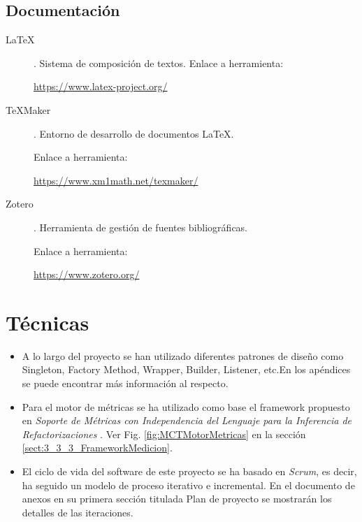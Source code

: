 \subsection{Documentación}
\begin{description}
	\item[LaTeX]. Sistema de composición de textos.
		Enlace a herramienta:
		
		\url{https://www.latex-project.org/}
		
	\item[TeXMaker]. Entorno de desarrollo de documentos LaTeX.
	
		Enlace a herramienta:
		
		\url{https://www.xm1math.net/texmaker/}
	
	\item[Zotero]. Herramienta de gestión de fuentes bibliográficas.
		
		Enlace a herramienta:
		
		\url{https://www.zotero.org/}
	
\end{description}
\section{Técnicas}
\begin{itemize}
	\item A lo largo del proyecto se han utilizado diferentes patrones de diseño \cite{gamma_patrones_2002} como Singleton, Factory Method, Wrapper, Builder, Listener, etc.En los apéndices se puede encontrar más información al respecto.
	
	\item Para el motor de métricas se ha utilizado como base el framework propuesto en \textit{Soporte de Métricas con Independencia del Lenguaje para la Inferencia de Refactorizaciones} \cite{marticorena_sanchez_soporte_2005}. Ver Fig. \ref{fig:MCTMotorMetricas} en la sección \ref{sect:3_3_3_FrameworkMedicion}.
	
	\item El ciclo de vida del software de este proyecto se ha basado en \textit{Scrum}\cite{scrum_master_scrum_2019}, es decir, ha seguido un modelo de proceso iterativo e incremental. En el documento de anexos en su primera sección titulada Plan de proyecto se mostrarán los detalles de las iteraciones.
\end{itemize}
